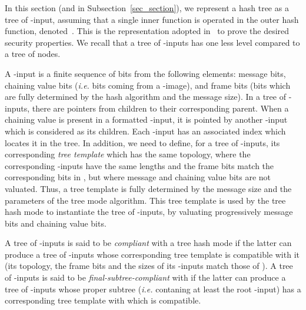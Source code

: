 \documentclass{llncs}
\begin{document}
In this section (and in Subsection~\ref{sec_section}), we represent a hash tree as a tree of -input,
assuming that a single inner function  is operated in the outer hash function, denoted~.
This is the representation adopted in~\cite{BDPV09,BDPV14_Suf} to prove the desired security properties.
We recall that a tree of -inputs has one less level compared to a tree of nodes. 

A -input is a finite 
sequence of bits from the following elements: message bits, chaining value bits (\emph{i.e.} bits coming from a -image), and frame bits
(bits which are fully determined by the hash algorithm and the message size). In a tree of -inputs, there are pointers from children to their corresponding parent. 
When a chaining value is present in a formatted -input, it is
pointed by another -input which is considered as its children. Each -input has an associated index which locates it in the tree.
In addition, we need to define, for a tree  of -inputs, its corresponding \emph{tree template}  which has the same topology, where the corresponding -inputs
have the same lengths and the frame bits match the corresponding bits in , but where message and chaining value bits are not valuated. 
Thus, a tree template is fully determined by the message size 
and the parameters of the tree mode algorithm. This tree template
is used by the tree hash mode to instantiate the tree of -inputs, by valuating progressively message bits and chaining value bits.


A tree  of -inputs is said to be \emph{compliant} with a tree hash mode  if the latter can produce a tree of -inputs whose corresponding tree template
is compatible with it (its topology, the frame bits and the sizes of its -inputs match those of ). A tree  of -inputs is said to be 
\emph{final-subtree-compliant} with  if the latter can produce a tree of -inputs whose proper subtree (\textit{i.e.} contaning at least the root -input) 
has a corresponding tree template with which  is compatible.
\end{document}
